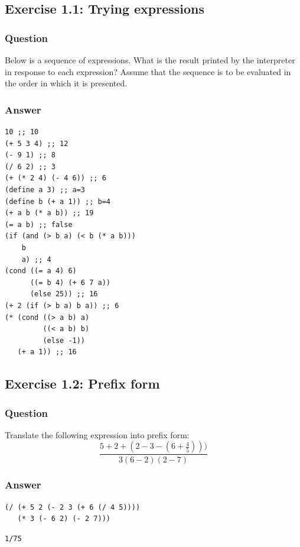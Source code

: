 \documentclass[final,fleqn,titlepage,twoside]{article}
\begin{document}
\subsection{Exercise 1.1: Trying expressions}
\label{sec:org2531ebb}
\subsubsection{Question}
\label{sec:orgd5be737}
Below is a sequence of expressions. What is the result printed by the
interpreter in response to each expression? Assume that the sequence is to be
evaluated in the order in which it is presented.


\subsubsection{Answer}
\label{sec:org87b5f4d}
\begin{verbatim}
10 ;; 10
(+ 5 3 4) ;; 12
(- 9 1) ;; 8
(/ 6 2) ;; 3
(+ (* 2 4) (- 4 6)) ;; 6
(define a 3) ;; a=3
(define b (+ a 1)) ;; b=4
(+ a b (* a b)) ;; 19
(= a b) ;; false
(if (and (> b a) (< b (* a b)))
    b
    a) ;; 4
(cond ((= a 4) 6)
      ((= b 4) (+ 6 7 a))
      (else 25)) ;; 16
(+ 2 (if (> b a) b a)) ;; 6
(* (cond ((> a b) a)
         ((< a b) b)
         (else -1))
   (+ a 1)) ;; 16
\end{verbatim}

\subsection{Exercise 1.2: Prefix form}
\label{sec:orgb06463a}
\subsubsection{Question}
\label{sec:orgb7da1eb}
Translate the following expression into prefix form:
\[
  \frac{5 + 2 + (2 - 3 - (6 + \frac{4}{5})))}
            {3(6 - 2)(2 - 7)}
\]


\subsubsection{Answer}
\label{sec:org42a275b}
\begin{verbatim}
(/ (+ 5 2 (- 2 3 (+ 6 (/ 4 5))))
   (* 3 (- 6 2) (- 2 7)))
\end{verbatim}

\begin{verbatim}
1/75
\end{verbatim}
\end{document}
